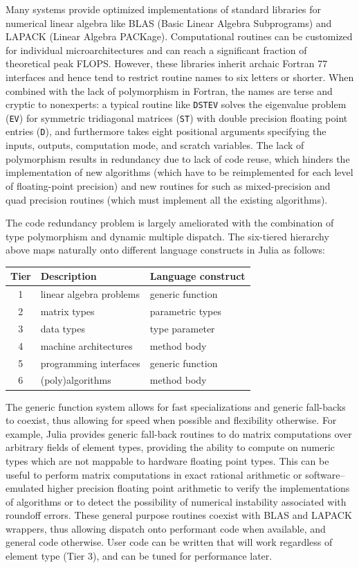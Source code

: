 \documentclass[pldi]{sigplanconf-pldi15}
\begin{document}
Many systems provide optimized implementations of standard libraries for
numerical linear algebra like BLAS (Basic Linear Algebra Subprograms) and
LAPACK (Linear Algebra PACKage). Computational routines can be customized
for individual microarchitectures and can reach a significant fraction of
theoretical peak FLOPS. However, these libraries inherit archaic Fortran 77
interfaces and hence tend to restrict routine names to six letters or shorter.
When combined with the lack of polymorphism in Fortran, the names are terse and
cryptic to nonexperts: a typical routine like \verb|DSTEV| solves the
eigenvalue problem (\verb|EV|) for symmetric tridiagonal matrices (\verb|ST|)
with double precision floating point entries (\verb|D|), and furthermore takes
eight positional arguments specifying the inputs, outputs, computation mode,
and scratch variables. The lack of polymorphism results in redundancy due to
lack of code reuse, which hinders the implementation of new algorithms (which
have to be reimplemented for each level of floating-point precision) and new
routines for such as mixed-precision and quad precision routines (which must
implement all the existing algorithms).

The code redundancy problem is largely ameliorated with the combination of type
polymorphism and dynamic multiple dispatch. The six-tiered hierarchy above maps
naturally onto different language constructs in Julia as follows:

\vspace{12pt}
\begin{tabular}{c l l}
	\hline
	Tier & Description & Language construct \\ \hline
	1 & linear algebra problems & generic function \\
	2 & matrix types & parametric types \\
	3 & data types & type parameter \\
	4 & machine architectures & method body \\
	5 & programming interfaces & generic function \\
	6 & (poly)algorithms & method body \\ \hline
\end{tabular}
\vspace{12pt}

The generic function system allows for fast specializations and generic
fall-backs to coexist, thus allowing for speed when possible and flexibility
otherwise. For example, Julia provides generic fall-back routines to do matrix
computations over arbitrary fields of element types, providing the ability to
compute on numeric types which are not mappable to hardware floating point
types. This can be useful to perform matrix computations in exact rational
arithmetic or software--emulated higher precision floating point arithmetic to
verify the implementations of algorithms or to detect the possibility of
numerical instability associated with roundoff errors. These general purpose
routines coexist with BLAS and LAPACK wrappers, thus allowing dispatch onto
performant code when available, and general code otherwise. User code can be
written that will work regardless of element type (Tier 3), and can be tuned
for performance later.
\end{document}

